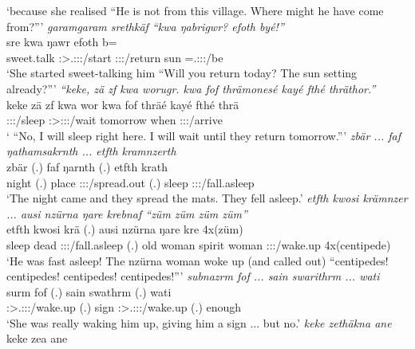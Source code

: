 \begin{exe}
	\trans `because she realised ``He is not from this village. Where might he have come from?'''
	\emph{garamgaram srethkäf ``kwa ŋabrigwr? efoth byé!''}\\
	 sre kwa ŋawr efoth b=\\
	{sweet.talk} \Stsg:\Sbj>\Tsg.\Masc:\Obj:\Irr:\Pfv/start {\Fut} \Stsg:\Sbj:\Nonpast:\Ipfv/return sun \Med=\Tsg.\Masc:\Sbj:\Nonpast:\Ipfv/be\\
	\trans `She started sweet-talking him ``Will you return today? The sun setting already?'''
	\emph{``keke, zä zf kwa worugr. kwa fof thrämonesé kayé fthé thräthor.''}\\
	\gll keke zä zf kwa wor kwa fof thräé kayé fthé thrä\\
	{\Neg} {\Prox} {\Imm} {\Fut} \Fsg:\Sbj:\Nonpast:\Ipfv/sleep {\Fut} {\Emph} \Fsg:\Sbj>\Stpl:\Obj:\Irr:\Pfv/wait tomorrow when \Stpl:\Sbj:\Irr:\Pfv/arrive\\
	\trans ` ``No, I will sleep right here. I will wait until they return tomorrow.'''
	\emph{zbär ... faf ŋathamsakrnth ... etfth kramnzerth}\\
	\gll zbär (.) faf ŋarnth (.) etfth krath\\
	night (.) place \Stdu:\Sbj:\Nonpast:\Ipfv/spread.out (.) sleep \Stdu:\Sbj:\Irr:\Pfv/fall.asleep\\
	\trans `The night came and they spread the mats. They fell asleep.'
	\emph{etfth kwosi krämnzer ... ausi nzürna ŋare krebnaf ``züm züm züm züm''}\\
	\gll etfth kwosi krä (.) ausi nzürna ŋare kre 4x(züm)\\
	sleep dead \Stsg:\Sbj:\Irr:\Pfv/fall.asleep (.) {old woman} spirit woman \Stsg:\Sbj:\Irr:\Pfv/wake.up 4x(centipede)\\
	\trans `He was fast asleep! The nzürna woman woke up (and called out) ``centipedes! centipedes! centipedes! centipedes!'''
	\emph{subnazrm fof ... sain swarithrm ... wati}\\
	\gll surm fof (.) sain swathrm (.) wati\\
	\Sg:\Sbj>\Tsg.\Masc:\Obj:\Pst:\Dur/wake.up {\Emph} (.) sign \Sg:\Sbj>\Tsg.\Masc:\Io:\Pst:\Dur/wake.up (.) enough\\
	\trans `She was really waking him up, giving him a sign ... but no.'
	\emph{keke zethäkna ane}\\
	\gll keke zea ane\\

\end{exe}
